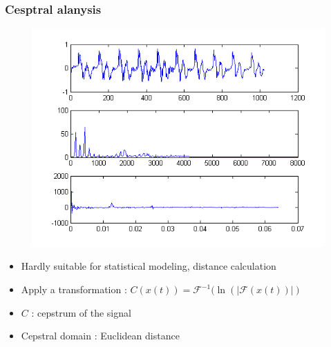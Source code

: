 \documentclass[11pt,english]{beamer}
\begin{document}
\begin{frame}
  \frametitle{Cesptral alanysis}
    \begin{figure}
    \centering
    \includegraphics[trim={0 7.2cm 0 0}, clip, scale = 0.8]{cepstre.png}
    \end{figure}
      
    \begin{itemize}
    \item Hardly suitable for statistical modeling, distance calculation
    \item Apply a transformation :
    $ C(x(t)) = \mathcal{F}^{-1}(\ln(|\mathcal{F}(x(t))|)  $
    \item $C$ : cepstrum of the signal
    \item Cepstral domain : Euclidean distance
    \end{itemize}
  
\end{frame}
\end{document}
